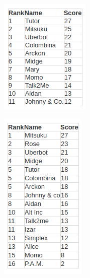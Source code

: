\documentclass{article}
\begin{document}
\begin{figure}[h]
\centering
\begin{minipage}{.5\textwidth}
  \centering
  \includegraphics[width=.4\linewidth]{TT2018}
  \label{fig:tt2018}
\end{minipage}%
\begin{minipage}{.5\textwidth}
  \centering
  \includegraphics[width=.4\linewidth]{TT2017}
  \label{fig:tt2017}
\end{minipage}
\end{figure}
\end{document}
